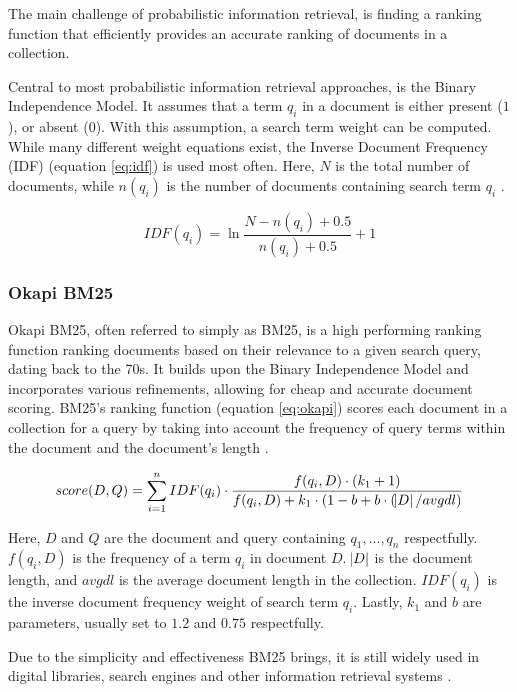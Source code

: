 \documentclass[twoside]{uva-inf-bachelor-thesis}
\begin{document}
The main challenge of probabilistic information retrieval, is finding a ranking function that efficiently provides an accurate ranking of documents in a collection. 

Central to most probabilistic information retrieval approaches, is the Binary Independence Model. It assumes that a term $q_{i}$ in a document is either present ($1$), or absent ($0$). With this assumption, a search term weight can be computed. While many different weight equations exist, the Inverse Document Frequency (IDF) (equation \ref{eq:idf}) is used most often.
Here, $N$ is the total number of documents, while $n(q_{i})$ is the number of documents containing search term $q_{i}$ \cite{Robertson09}. 

\begin{equation}\label{eq:idf}
    IDF(q_{i}) = \ln{\frac{N - n(q_{i}) + 0.5}{n(q_{i}) +0.5} + 1}
\end{equation}

\subsubsection{Okapi BM25}
Okapi BM25, often referred to simply as BM25, is a high performing ranking function ranking documents based on their relevance to a given search query, dating back to the 70s. It builds upon the Binary Independence Model and incorporates various refinements, allowing for cheap and accurate document scoring.
BM25's ranking function (equation \ref{eq:okapi}) scores each document in a collection for a query by taking into account the frequency of query terms within the document and the document's length \cite{Robertson09, manning08IR}.

\begin{equation}\label{eq:okapi}
    score(D, Q) = \sum^{n}_{i=1} IDF(q_{i}) \cdot \frac{f(q_{i}, D) \cdot (k_{1}+1)}{f(q_{i}, D)+k_{1} \cdot (1-b+b \cdot (\abs{D}/avgdl)}
\end{equation}

Here, $D$ and $Q$ are the document and query containing $q_{1}, ..., q_{n}$ respectfully. $f(q_{i}, D)$ is the frequency of a term $q_{i}$ in document $D$. $\abs{D}$ is the document length, and $avgdl$ is the average document length in the collection. $IDF(q_{i})$ is the inverse document frequency weight of search term $q_{i}$. Lastly, $k_1$ and $b$ are parameters, usually set to $1.2$ and $0.75$ respectfully.

Due to the simplicity and effectiveness BM25 brings, it is still widely used in digital libraries, search engines and other information retrieval systems \cite{Robertson09}.
\end{document}
